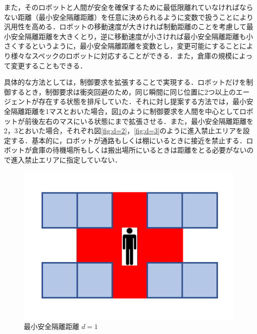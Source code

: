 また，そのロボットと人間が安全を確保するために最低限離れていなければならない距離（最小安全隔離距離）を任意に決められるように変数で扱うことにより汎用性を高める．ロボットの移動速度が大きければ制動距離のことを考慮して最小安全隔離距離を大きくとり，逆に移動速度が小さければ最小安全隔離距離も小さくするというように，最小安全隔離距離を変数とし，変更可能にすることにより様々なスペックのロボットに対応することができる．また，倉庫の規模によって変更することもできる．

具体的な方法としては，制御要求を拡張することで実現する．ロボットだけを制御するとき，制御要求は衝突回避のため，同じ瞬間に同じ位置に2つ以上のエージェントが存在する状態を排斥していた．それに対し提案する方法では，最小安全隔離距離を1マスとおいた場合，図\ref{fig:d=1}のように制御要求を人間を中心としてロボットが前後左右のマスにいる状態にまで拡張させる．また，最小安全隔離距離を2，3とおいた場合，それぞれ図\ref{fig:d=2}，\ref{fig:d=3}のように進入禁止エリアを設定する．基本的に，ロボットが通路もしくは棚にいるときに接近を禁止する．ロボットが倉庫の待機場所もしくは搬出場所にいるときは距離をとる必要がないので進入禁止エリアに指定していない．


\begin{figure}[h]
    \centering
    \includegraphics[scale=0.5]{figures/4_d=1.png}
    \caption{最小安全隔離距離 $d=1$}
    \label{fig:d=1}
\end{figure}

